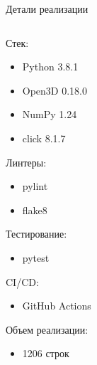 \documentclass[aspectratio=169]{beamer}
\begin{document}
  \begin{frame}{Детали реализации}
    \vspace{\baselineskip}
    \begin{columns}
        \begin{scriptsize}
          Стек:
          \begin{itemize}
            \item Python 3.8.1
            \item Open3D 0.18.0
            \item NumPy 1.24
            \item click 8.1.7
          \end{itemize}
          Линтеры:
          \begin{itemize}
            \item pylint
            \item flake8
          \end{itemize}
          Тестирование:
          \begin{itemize}
            \item pytest
          \end{itemize}
          CI/CD:
          \begin{itemize}
            \item GitHub Actions
          \end{itemize}
          Объем реализации:
          \begin{itemize}
            \item 1206 строк
          \end{itemize}
        \end{scriptsize}
\end{columns}
\end{frame}
\end{document}
